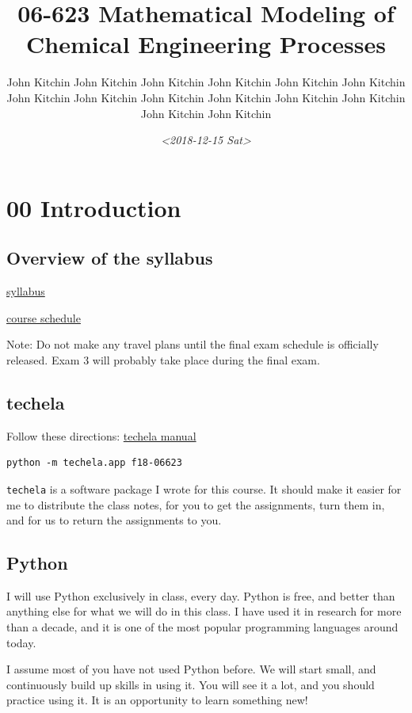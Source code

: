 \documentclass[11pt]{article}
\author{John Kitchin John Kitchin John Kitchin John Kitchin John Kitchin John Kitchin John Kitchin John Kitchin John Kitchin John Kitchin John Kitchin John Kitchin John Kitchin John Kitchin}
\date{\textit{<2018-12-15 Sat>}}
\title{06-623 Mathematical Modeling of Chemical Engineering Processes}
\begin{document}
\tableofcontents


\section{00 Introduction}
\label{sec:org184ee45}
\subsection{Overview of the syllabus}
\label{sec:org51f7bbf}

\href{https://github.com/jkitchin/f18-06623//blob/master/syllabus.org}{syllabus}

\href{https://github.com/jkitchin/f18-06623//blob/master/course-schedule.org}{course schedule}

Note: Do not make any travel plans until the final exam schedule is officially released. Exam 3 will probably take place during the final exam.

\subsection{techela}
\label{sec:org4ae76f3}

Follow these directions: \href{https://github.com/jkitchin/f18-06623/blob/master/lectures/techela-manual.org}{techela manual}

\begin{verbatim}
python -m techela.app f18-06623
\end{verbatim}

\texttt{techela} is a software package I wrote for this course. It should make it easier for me to distribute the class notes, for you to get the assignments, turn them in, and for us to return the assignments to you.

\subsection{Python}
\label{sec:org28170f0}

I will use Python exclusively in class, every day. Python is free, and better than anything else for what we will do in this class. I have used it in research for more than a decade, and it is one of the most popular programming languages around today.

I assume most of you have not used Python before. We will start small, and continuously build up skills in using it. You will see it a lot, and you should practice using it. It is an opportunity to learn something new!
\end{document}
